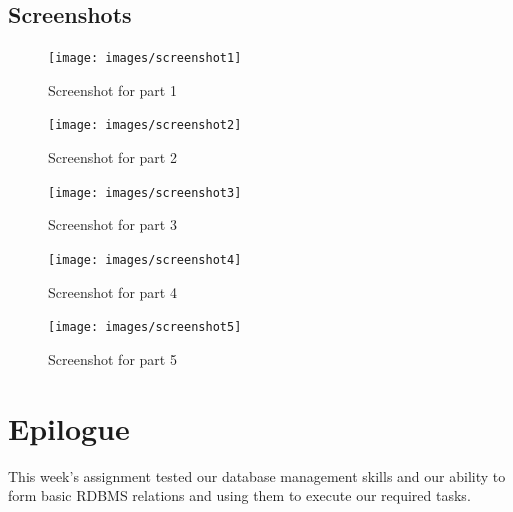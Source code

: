 \documentclass[11pt]{report}
\begin{document}
\subsection{Screenshots}
\begin{figure}[h!]
\centering
\texttt{[image: images/screenshot1]}
\caption{Screenshot for part 1}
\end{figure}
\pagebreak
\begin{figure}[h!]
\centering
\texttt{[image: images/screenshot2]}
\caption{Screenshot for part 2}
\end{figure}
\pagebreak
\begin{figure}[h!]
\centering
\texttt{[image: images/screenshot3]}
\caption{Screenshot for part 3}
\end{figure}
\pagebreak
\begin{figure}[h!]
\centering
\texttt{[image: images/screenshot4]}
\caption{Screenshot for part 4}
\end{figure}
\pagebreak
\begin{figure}[h!]
\centering
\texttt{[image: images/screenshot5]}
\caption{Screenshot for part 5}
\end{figure}
\pagebreak
\section{Epilogue}
This week's assignment tested our database management skills and our ability to form basic RDBMS relations and using them to execute our required tasks. 
 

\nocite{*}
\end{document}
